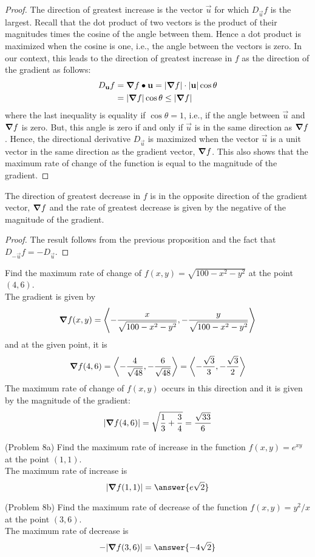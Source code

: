 \documentclass[handout]{ximera}
\begin{document}
\begin{proof}
The direction of greatest increase is the vector $\vec u$ for which $D_{\vec u}f$ is the largest. 
Recall that the dot product of two vectors is the product of their magnitudes times the cosine of the angle between them.  
Hence a dot product is maximized when the cosine is one, i.e., the angle between the vectors is zero.  
In our context, this leads to the direction of greatest
increase in $f$ as the direction of the gradient as follows:
\begin{align*}
D_{\mathbf u} f &= \boldsymbol\nabla f \bullet \mathbf u = |\boldsymbol\nabla f| \cdot |\mathbf u| \cos \theta\\
             &= |\boldsymbol\nabla f| \cos \theta \leq |\boldsymbol\nabla f|
\end{align*}
where the last inequality is equality if $\cos \theta = 1$, i.e., if the angle between $\vec u$ and $\boldsymbol\nabla f$ is zero.
But, this angle is zero if and only if $\vec u$ is in the same direction as $\boldsymbol\nabla f$.  Hence, the directional derivative
$D_{\vec u}$ is maximized when the vector $\vec u$ is a unit vector in the same direction as the gradient vector, $\boldsymbol\nabla f$.
This also shows that the maximum rate of change of the function is equal to the magnitude of the gradient.
\end{proof}

\begin{corollary}
The direction of greatest decrease in $f$ is in the opposite direction of the gradient vector, $\boldsymbol\nabla f$ and the rate of greatest decrease is given by
the negative of the magnitude of the gradient.
\end{corollary}
\begin{proof}
The result follows from the previous proposition and the fact that $D_{-\vec u} f = -D_{\vec u}$.
\end{proof}

\begin{example}[Example 8]
Find the maximum rate of change of $f(x,y) = \sqrt{100 - x^2 - y^2}$ at the point $(4, 6)$.\\
The gradient is given by
\[
\boldsymbol\nabla f(x,y) = \left\langle -\frac{x}{\sqrt{100 - x^2 - y^2}}, -\frac{y}{\sqrt{100 - x^2 - y^2}}\right\rangle
\]
and at the given point, it is
\[
\boldsymbol\nabla f(4,6) = \left\langle -\frac{4}{\sqrt{48}}, -\frac{6}{\sqrt{48}}\right\rangle = \left\langle -\frac{\sqrt 3}{3}, -\frac{\sqrt 3}{2}\right\rangle
\]
The maximum rate of change of $f(x,y)$ occurs in this direction and it is given by the magnitude of the gradient:
\[
|\boldsymbol\nabla f(4,6)| = \sqrt{\frac13 + \frac34} = \frac{\sqrt{33}}{6}
\]
\end{example}

\begin{problem}(Problem 8a)
Find the maximum rate of increase in the function $f(x,y) = e^{xy}$ at the point $(1, 1)$.\\
The maximum rate of increase is 
\[
|\grad f(1, 1)| = \answer{e\sqrt 2}
\]
\end{problem}

\begin{problem}(Problem 8b)
Find the maximum rate of decrease of the function $f(x,y) = y^2/x$ at the point $(3, 6)$.\\
The maximum rate of decrease is 
\[
-|\grad f(3, 6)| = \answer{-4\sqrt 2}
\]
\end{problem}
\end{document}
